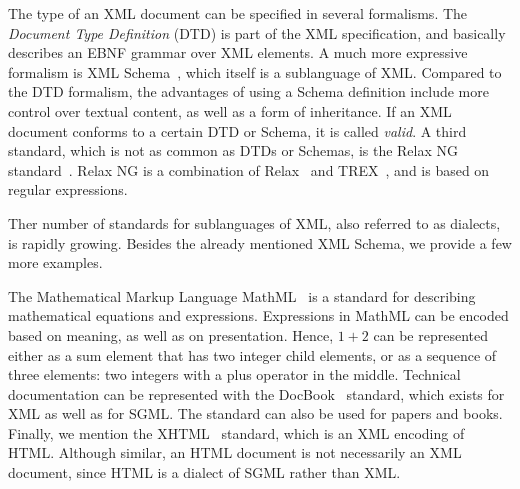 The type of an XML document can be specified in several formalisms. The {\em Document Type Definition} (DTD) is part of the XML specification, and basically describes an EBNF grammar over XML elements. A much more expressive formalism is XML Schema~\cite{xmlSchema1}, which itself is a sublanguage of XML. Compared to the DTD formalism, the advantages of using a Schema definition include more control over textual content, as well as a form of inheritance. If an XML document conforms to a certain DTD or Schema, it is called {\em valid}. A third standard, which is not as common as DTDs or Schemas, is the Relax NG standard~\cite{relaxNG01}. Relax NG is a combination of Relax~\cite{relax01} and TREX~\cite{trex01}, and is based on regular expressions. 



Ther number of standards for sublanguages of XML, also referred to as dialects, is rapidly growing. Besides the already mentioned XML Schema, we provide a few more examples.

The Mathematical Markup Language MathML~\cite{mathml20} is a standard for describing mathematical equations and expressions.  \bc Expressions in MathML can be encoded based on  meaning, as well as on presentation. Hence, $1+2$ can be represented either as a sum  element that has two integer child elements, or as a sequence of three elements: two integers with a plus operator in the middle.  \ec Technical documentation can be represented with the DocBook~\cite{walsh02docbook} standard, which exists for XML as well as for SGML. The standard can also be used for papers and books. Finally, we mention the XHTML~\cite{xhtml11} standard, which is an XML encoding of HTML. Although similar, an HTML document is not necessarily an XML document, since HTML is a dialect of SGML rather than XML.





